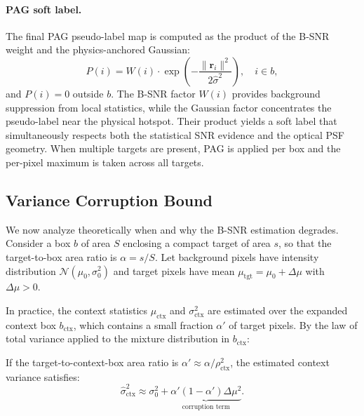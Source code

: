 \paragraph{PAG soft label.}
The final PAG pseudo-label map is computed as the product of the B-SNR weight and
the physics-anchored Gaussian:
\begin{equation}
    \boxed{P(i) = W(i) \cdot \exp\!\left(-\frac{\|\mathbf{r}_i\|^2}{2\hat{\sigma}^2}\right)},
    \quad i \in b,
    \label{eq:pag_final}
\end{equation}
and $P(i) = 0$ outside $b$.
The B-SNR factor $W(i)$ provides background suppression from local statistics, while
the Gaussian factor concentrates the pseudo-label near the physical hotspot.
Their product yields a soft label that simultaneously respects both the statistical
SNR evidence and the optical PSF geometry.
When multiple targets are present, PAG is applied per box and the per-pixel maximum
is taken across all targets.

\subsection{Variance Corruption Bound}
\label{sec:method_theory}

We now analyze theoretically when and why the B-SNR estimation degrades.
Consider a box $b$ of area $S$ enclosing a compact target of area $s$, so that the
target-to-box area ratio is $\alpha = s/S$.
Let background pixels have intensity distribution $\mathcal{N}(\mu_0, \sigma_0^2)$ and
target pixels have mean $\mu_\mathrm{tgt} = \mu_0 + \Delta\mu$ with $\Delta\mu > 0$.

In practice, the context statistics $\mu_\mathrm{ctx}$ and $\sigma_\mathrm{ctx}^2$ are
estimated over the expanded context box $b_\mathrm{ctx}$, which contains a small
fraction $\alpha'$ of target pixels.
By the law of total variance applied to the mixture distribution in $b_\mathrm{ctx}$:

\begin{proposition}
\label{prop:vcb}
If the target-to-context-box area ratio is $\alpha' \approx \alpha / \rho_\mathrm{ctx}^2$,
the estimated context variance satisfies:
\begin{equation}
    \hat{\sigma}_\mathrm{ctx}^2 \approx \sigma_0^2
    + \underbrace{\alpha'(1 - \alpha')\Delta\mu^2}_{\text{corruption term}}.
    \label{eq:vcb}
\end{equation}
\end{proposition}

